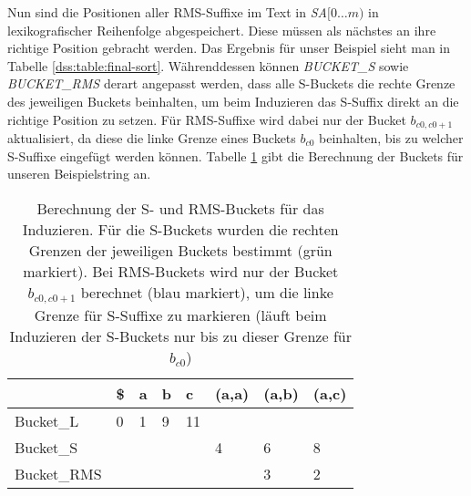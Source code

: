 Nun sind die Positionen aller RMS-Suffixe im Text in \textit{SA$[0\dots m)$} in lexikografischer Reihenfolge abgespeichert. Diese müssen als nächstes an ihre richtige Position gebracht werden. Das Ergebnis für unser Beispiel sieht man in Tabelle \ref{dss:table:final-sort}. Währenddessen können \textit{BUCK\-ET\_S} sowie \textit{BUCK\-ET\_RMS} derart angepasst werden, dass alle S-Buckets die rechte Grenze des jeweiligen Buckets beinhalten, um beim Induzieren das S-Suffix direkt an die richtige Position zu setzen. Für RMS-Suffixe wird dabei nur der Bucket $b_{c0,c0+1}$ aktualisiert, da diese die linke Grenze eines Buckets $b_{c0}$ beinhalten, bis zu welcher S-Suffixe eingefügt werden können. Tabelle \ref{dss:table:last-buckets} gibt die Berechnung der Buckets für unseren Beispielstring an.

\begin{table}
	\begin{tabular}{l|l|l|l|l|l|l|l|}
		\cline{2-8}
		& \$ & a & b & c  & (a,a)                     & (a,b)                     & (a,c)                     \\ \hline
		\multicolumn{1}{|l|}{Bucket\_L}   & 0  & 1 & 9 & 11 &                           &                           &                           \\ \hline
		\multicolumn{1}{|l|}{Bucket\_S}   &    &   &   &    & \cellcolor[HTML]{32CB00}4 & \cellcolor[HTML]{32CB00}6 & \cellcolor[HTML]{32CB00}8 \\ \hline
		\multicolumn{1}{|l|}{Bucket\_RMS} &    &   &   &    &                           & \cellcolor[HTML]{3166FF}3 & 2                         \\ \hline
	\end{tabular}
	\caption{Berechnung der S- und RMS-Buckets für das Induzieren. Für die S-Buckets wurden die rechten Grenzen der jeweiligen Buckets bestimmt (grün markiert). Bei RMS-Buckets wird nur der Bucket $b_{c0, c0+1}$ berechnet (blau markiert), um die linke Grenze für S-Suffixe zu markieren (läuft beim Induzieren der S-Buckets nur bis zu dieser Grenze für $b_{c0}$)}
	\label{dss:table:last-buckets}
\end{table}
